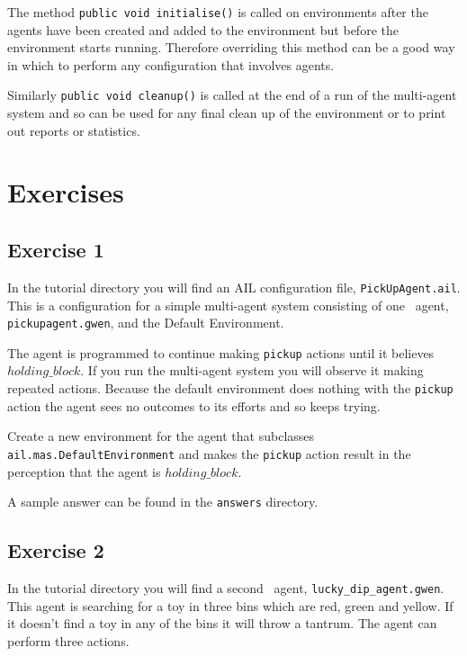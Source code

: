 \documentclass[a4]{article}
\begin{document}
The method \texttt{public void initialise()} is called on environments after the agents have been created and added to the environment but before the environment starts running.  Therefore overriding this method can be a good way in which to perform any configuration that involves agents.

Similarly \texttt{public void cleanup()} is called at the end of a run of the multi-agent system and so can be used for any final clean up of the environment or to print out reports or statistics.

\section{Exercises}

\subsection{Exercise 1}
In the tutorial directory you will find an AIL configuration file, \texttt{PickUpAgent.ail}.  This is a configuration for a simple multi-agent system consisting of one \gwendolen\ agent, \texttt{pickupagent.gwen}, and the Default Environment.

The agent is programmed to continue making \texttt{pickup} actions  until it believes $holding\_block$.  If you run the multi-agent system you will observe it making repeated actions.  Because the default environment does nothing with the \texttt{pickup} action the agent sees no outcomes to its efforts and so keeps trying.

\begin{sloppypar}
Create a new environment for the agent that subclasses \texttt{ail.mas.DefaultEnvironment} and makes the \texttt{pickup} action result in the perception that the agent is $holding\_block$.
\end{sloppypar}

A sample answer can be found in the \texttt{answers} directory.

\subsection{Exercise 2}
\begin{sloppypar}
In the tutorial directory you will find a second \gwendolen\ agent, \texttt{lucky\_dip\_agent.gwen}.  This agent is searching for a toy in three bins which are red, green and yellow.  If it doesn't find a toy in any of the bins it will throw a tantrum.  The agent can perform three actions.
\end{sloppypar}
\end{document}
